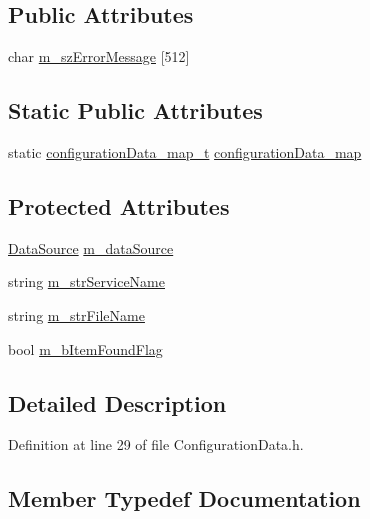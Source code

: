\subsection*{Public Attributes}
\begin{DoxyCompactItemize}
\item 
char \hyperlink{classConfigurationData_aefb528ceef393a3d4a016ab52fca5c0b}{m\+\_\+sz\+Error\+Message} \mbox{[}512\mbox{]}
\end{DoxyCompactItemize}
\subsection*{Static Public Attributes}
\begin{DoxyCompactItemize}
\item 
static \hyperlink{classConfigurationData_a88b45bf304a35e4e78cfce6688087cce}{configuration\+Data\+\_\+map\+\_\+t} \hyperlink{classConfigurationData_a7068df8bceb0fd7e24abde430532eeca}{configuration\+Data\+\_\+map}
\end{DoxyCompactItemize}
\subsection*{Protected Attributes}
\begin{DoxyCompactItemize}
\item 
\hyperlink{classConfigurationData_a6b159be92b02274088a4de34584eeabc}{Data\+Source} \hyperlink{classConfigurationData_a76fde55e5e58cd5726449bee19c378dd}{m\+\_\+data\+Source}
\item 
string \hyperlink{classConfigurationData_aae2da98258156ab8a7b4884694d5cea7}{m\+\_\+str\+Service\+Name}
\item 
string \hyperlink{classConfigurationData_a3c2246db7a0a2cfa91081e91a98625df}{m\+\_\+str\+File\+Name}
\item 
bool \hyperlink{classConfigurationData_a358d8d3d441e31872a9f52a5dd0a8943}{m\+\_\+b\+Item\+Found\+Flag}
\end{DoxyCompactItemize}


\subsection{Detailed Description}


Definition at line 29 of file Configuration\+Data.\+h.



\subsection{Member Typedef Documentation}
